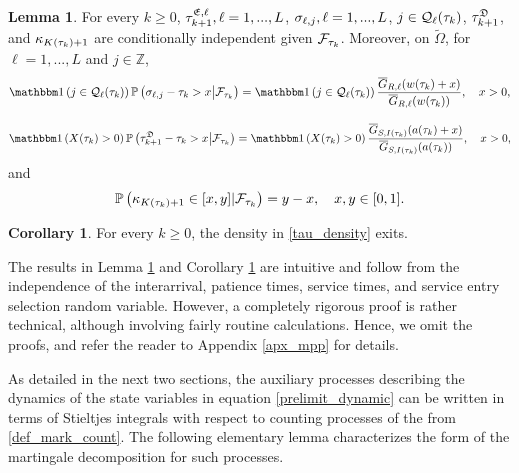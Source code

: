 \documentclass{article}
\theoremstyle{definition}
\newtheorem{lemma}[theorem]{Lemma}
\newtheorem{corollary}[theorem]{Corollary}
\numberwithin{equation}{section}
\begin{document}
\begin{lemma}\label{lem_condInd}
For every $k\geq0$, $\tau^{\mathfrak{E},\ell}_{k+1},\ell=1,...,L$, $\sigma_{\ell,j}, \ell=1,...,L$, $j\in\mathcal{Q}_\ell(\tau_k)$, $\tau^{\mathfrak{D}}_{k+1}$, and $\kappa_{K(\tau_k)+1}$ are conditionally independent given $\mathcal{F}_{\tau_k}$. Moreover, on $\tilde\Omega$, for $\ell=1,...,L$ and $j\in\mathbb{Z}$,
\begin{equation}\label{cond_density_reneg}
  \indic{j\in\inque_\ell(\tau_k)}\Prob{\renegtime_{\ell,j}-\tau_k>x\big|\filt_{\tau_k}} =\indic{j\in\inque_\ell(\tau_k)}\frac{\overline G_{R,\ell}(\waiting(\tau_k)+x)} {\overline G_{R,\ell}(\waiting(\tau_k))}, \quad  x > 0,
\end{equation}

\begin{equation}\label{cond_density_departure}
    \indic{X(\tau_k)>0}\Prob{\nextdeparture_{k+1}-\tau_k>x\big|\filt_{\tau_k}} = \indic{X(\tau_k)>0}\frac{\overline G_{S,\class(\tau_k)}(\age(\tau_k)+x)}{\overline G_{S,\class(\tau_k)}(\age(\tau_k))}, \quad  x > 0,
\end{equation}
and
\begin{equation}\label{cond_density_selection}
    \mathbb{P}\left(\kappa_{K(\tau_k)+1}\in[x,y]|\mathcal{F}_{\tau_k}\right) = y-x, \quad x,y\in[0,1].
\end{equation}
\end{lemma}

\begin{corollary}\label{cor_density}
For every $k\geq0$, the density in \eqref{tau_density} exits.
\end{corollary}

The results in Lemma \ref{lem_condInd} and Corollary \ref{cor_density} are intuitive and follow from the independence of the interarrival, patience times, service times, and service entry selection random variable. However, a completely rigorous proof is rather technical, although involving fairly routine calculations. Hence, we omit the proofs, and refer the reader to Appendix \ref{apx_mpp} for  details.


As detailed in the next two sections, the auxiliary processes describing the dynamics of the state variables in equation \eqref{prelimit_dynamic} can be written in terms of Stieltjes integrals with respect to counting processes of the from \eqref{def_mark_count}. The following elementary lemma characterizes the form of the martingale decomposition for such processes.
\end{document}
